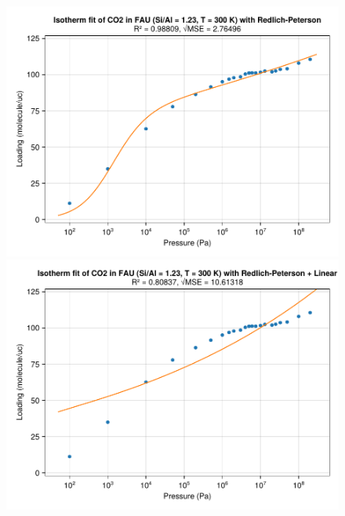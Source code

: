 \documentclass[main.tex]{subfiles}
\begin{document}
\begin{figure}
	\begin{minipage}{0.49\columnwidth}
		\includegraphics[width=\columnwidth]{figures/isotherms/Redlich-Peterson.pdf}
	\end{minipage}\hfill%
	\begin{minipage}{0.49\columnwidth}
		\includegraphics[width=\columnwidth]{figures/isotherms/Redlich-Peterson + Linear.pdf}
	\end{minipage}
	

\end{figure}
\end{document}
